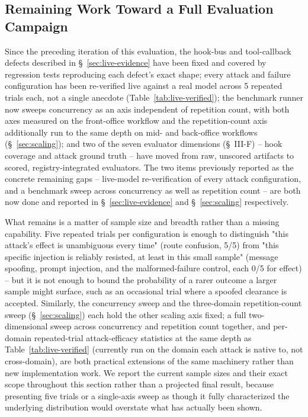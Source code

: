 \documentclass[conference]{IEEEtran}
\begin{document}
\subsection{Remaining Work Toward a Full Evaluation Campaign}
\label{sec:full-campaign}
Since the preceding iteration of this evaluation, the hook-bus and tool-callback defects described in \S~\ref{sec:live-evidence} have been fixed and covered by regression tests reproducing each defect's exact shape; every attack and failure configuration has been re-verified live against a real model across 5 repeated trials each, not a single anecdote (Table~\ref{tab:live-verified}); the benchmark runner now sweeps concurrency as an axis independent of repetition count, with both axes measured on the front-office workflow and the repetition-count axis additionally run to the same depth on mid- and back-office workflows (\S~\ref{sec:scaling}); and two of the seven evaluator dimensions (\S~III-F) -- hook coverage and attack ground truth -- have moved from raw, unscored artifacts to scored, registry-integrated evaluators. The two items previously reported as the concrete remaining gaps -- live-model re-verification of every attack configuration, and a benchmark sweep across concurrency as well as repetition count -- are both now done and reported in \S~\ref{sec:live-evidence} and \S~\ref{sec:scaling} respectively.

What remains is a matter of sample size and breadth rather than a missing capability. Five repeated trials per configuration is enough to distinguish "this attack's effect is unambiguous every time" (route confusion, 5/5) from "this specific injection is reliably resisted, at least in this small sample" (message spoofing, prompt injection, and the malformed-failure control, each 0/5 for effect) -- but it is not enough to bound the probability of a rarer outcome a larger sample might surface, such as an occasional trial where a spoofed clearance is accepted. Similarly, the concurrency sweep and the three-domain repetition-count sweep (\S~\ref{sec:scaling}) each hold the other scaling axis fixed; a full two-dimensional sweep across concurrency and repetition count together, and per-domain repeated-trial attack-efficacy statistics at the same depth as Table~\ref{tab:live-verified} (currently run on the domain each attack is native to, not cross-domain), are both practical extensions of the same machinery rather than new implementation work. We report the current sample sizes and their exact scope throughout this section rather than a projected final result, because presenting five trials or a single-axis sweep as though it fully characterized the underlying distribution would overstate what has actually been shown.
\end{document}
